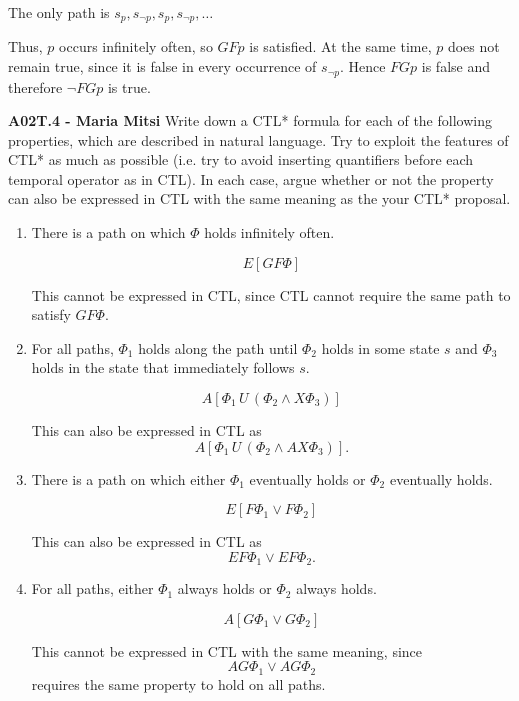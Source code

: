 \documentclass[12pt,a4paper]{article}
\begin{document}
\begin{description}
\begin{enumerate}[label=\alph*)]
The only path is $ s_p,s_{\neg p},s_p,s_{\neg p},\ldots $

Thus, $p$ occurs infinitely often, so $ GFp $ is satisfied. At the same time, $p$ does not remain true, since it is false in every occurrence of $s_{\neg p}$. Hence $ FGp $ is false and therefore $ \neg FGp $ is true.

\color{black}
\fi
%

\end{enumerate}

\item{\bf A02T.4 - Maria Mitsi} Write down a CTL* formula for each of the following properties, which are described in natural language. Try to exploit the features of CTL* as much as possible (i.e. try to avoid inserting quantifiers before each temporal operator as in CTL). In each case,
argue whether or not the property can also be expressed in CTL with the same meaning as the your CTL* proposal.
\begin{enumerate}[label=\alph*)]
\item There is a path on which $\Phi$ holds infinitely often.
%
\ifwithanswers
\color{blue}
\par
\[
E[GF\Phi]
\]

This cannot be expressed in CTL, since CTL cannot require the same path to satisfy $GF\Phi$.
\color{black}
\fi
%
\item For all paths, $\Phi_1$ holds along the path until $\Phi_2$ holds in some state $s$ and $\Phi_3$ holds in the state that immediately follows $s$.
%
\ifwithanswers
\color{blue}
\par
\[
A[\Phi_1\,U\,(\Phi_2\wedge X\Phi_3)]
\]

This can also be expressed in CTL as
\[
A[\Phi_1\,U\,(\Phi_2\wedge AX\Phi_3)].
\]
\color{black}
\fi
%
\item There is a path on which either $\Phi_1$ eventually holds or $\Phi_2$ eventually holds.
%
\ifwithanswers
\color{blue}
\par
\[
E[F\Phi_1\vee F\Phi_2]
\]

This can also be expressed in CTL as
\[
EF\Phi_1\vee EF\Phi_2.
\]\color{black}
\fi
%
\item For all paths, either $\Phi_1$ always holds or $\Phi_2$ always holds.
%
\ifwithanswers
\color{blue}
\par
\[
A[G\Phi_1\vee G\Phi_2]
\]

This cannot be expressed in CTL with the same meaning, since
\[
AG\Phi_1\vee AG\Phi_2
\]
requires the same property to hold on all paths.
\color{black}
\fi
%
\end{enumerate}


\end{description}
\end{document}
